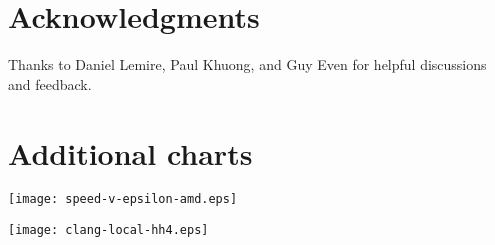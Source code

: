 \documentclass[runningheads]{llncs}
\begin{document}


%

\section*{Acknowledgments}
Thanks to Daniel Lemire, Paul Khuong, and Guy Even for helpful discussions and feedback.




\appendix
\section{Additional charts}

\texttt{[image: speed-v-epsilon-amd.eps]}

\texttt{[image: clang-local-hh4.eps]}




\end{document}
